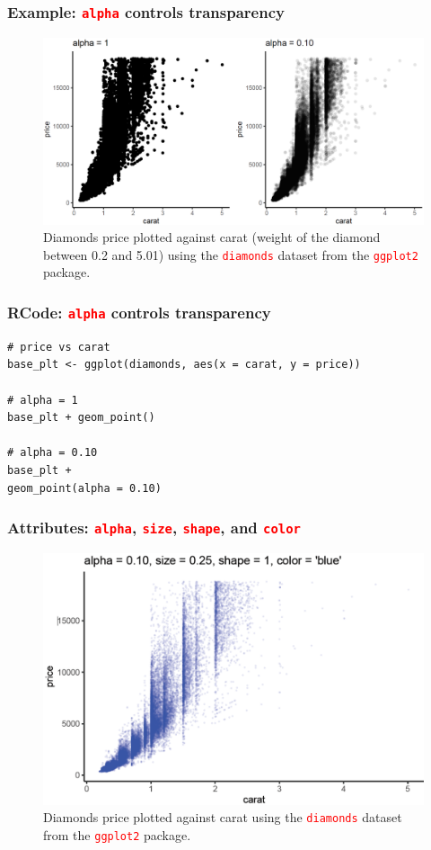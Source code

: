 \documentclass{beamer}
\begin{document}
\begin{frame}\frametitle{Example: \textcolor{red}{\texttt{alpha}} controls transparency}
\begin{figure}
\includegraphics[width=0.99\linewidth]{PlotsLec2/diam_alpha2}
\caption{\small{Diamonds price plotted against carat (weight of the diamond between 0.2 and 5.01) using the \textcolor{red}{\texttt{diamonds}} dataset  from the \textcolor{red}{\texttt{ggplot2}} package.}}
\end{figure}
\end{frame}

\begin{frame}[fragile]\frametitle{RCode: \textcolor{red}{\texttt{alpha}} controls transparency}
\lstset{basicstyle=\Large\ttfamily}
\begin{lstlisting}
# price vs carat
base_plt <- ggplot(diamonds, aes(x = carat, y = price))

# alpha = 1
base_plt + geom_point()

# alpha = 0.10
base_plt + 
geom_point(alpha = 0.10)
\end{lstlisting}
\end{frame}

\begin{frame}\frametitle{Attributes: \textcolor{red}{\texttt{alpha}}, \textcolor{red}{\texttt{size}}, \textcolor{red}{\texttt{shape}}, and \textcolor{red}{\texttt{color}}}
\begin{figure}
\includegraphics[width=0.99\linewidth]{PlotsLec2/diamonds2}
\caption{\small{Diamonds price plotted against carat using the \textcolor{red}{\texttt{diamonds}} dataset  from the \textcolor{red}{\texttt{ggplot2}} package.}}
\end{figure}
\end{frame}
\end{document}

